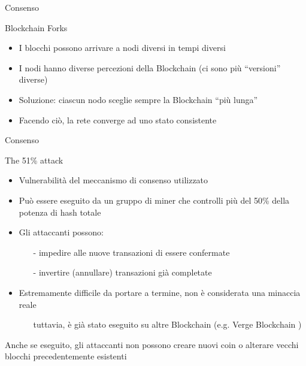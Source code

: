 \documentclass{beamer}
\begin{document}
  
  
  \begin{frame}{Consenso}
      \begin{block}{Blockchain Forks}
        \begin{itemize}
            \item I blocchi possono arrivare a nodi diversi in tempi diversi
            \item I nodi hanno diverse percezioni della Blockchain (ci sono più ``versioni'' diverse) 
            \item Soluzione: ciascun nodo sceglie sempre la Blockchain ``più lunga''  %
            \item Facendo ciò, la rete converge ad uno stato consistente 
        \end{itemize}
      \end{block}
  \end{frame}
  
  
  
  
  \begin{frame}{Consenso}
      \begin{block}{The 51\% attack}
        \begin{itemize}
            \item Vulnerabilità del meccanismo di consenso utilizzato
            \item Può essere eseguito da un gruppo di miner che controlli più del 50\% della potenza di hash totale
            \item Gli attaccanti possono: 
            \begin{itemize}
                \item[-] impedire alle nuove transazioni di essere confermate
                \item[-] invertire (annullare) transazioni già completate
            \end{itemize}
            \item Estremamente difficile da portare a termine, non è considerata una minaccia reale
            \begin{itemize}
                \item[\MVRightarrow] tuttavia, è già stato eseguito su altre Blockchain (e.g. Verge Blockchain \cite{bitcoinnews2018})
            \end{itemize}
        \end{itemize}
      \end{block}
      Anche se eseguito, gli attaccanti non possono creare nuovi coin o alterare vecchi blocchi precedentemente esistenti
  \end{frame}
  
\end{document}
